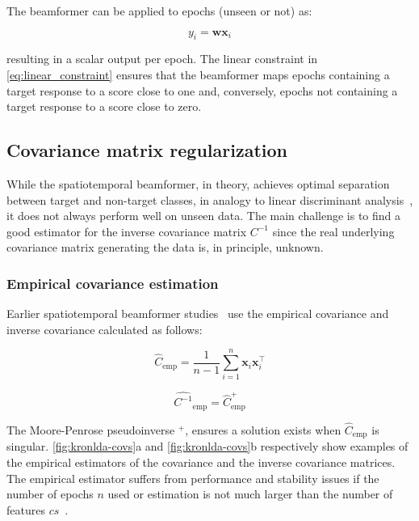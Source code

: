 	The beamformer can be applied to epochs (unseen or not) as:

	\begin{equation}
		y_i = \mathbf{w}\mathbf{x}_i
		\label{eq:apply_beamformer}
	\end{equation}

	resulting in a scalar output per epoch.
	The linear constraint in \autoref{eq:linear_constraint} ensures that the
	beamformer maps epochs containing a target response to a score close to one
	and, conversely, epochs not containing a target response to a score close to
	zero.

	\subsection{Covariance matrix regularization}
	While the spatiotemporal beamformer, in theory, achieves optimal separation
	between target and non-target classes, in analogy to linear discriminant analysis~\cite{TREDER2016279}, it does not always perform well on unseen data.
	The main challenge is to find a good estimator for the inverse covariance matrix $C^{-1}$ since the real underlying covariance matrix generating the data is, in principle, unknown.

	\subsubsection{Empirical covariance estimation}
	\label{sec:empirical_covariance}
	Earlier spatiotemporal beamformer studies~\cite{Wittevrongel2016,
		Wittevrongel2016a, Wittevrongel2017, Wittevrongel2017a} use the empirical
	covariance and inverse covariance calculated as follows:

	\begin{equation}
		\hat{C}_\text{emp} =
		\frac{1}{n-1}\sum^{n}_{i=1}\mathbf{x}_i\mathbf{x}_i^\intercal
		\label{eq:empirical_covariance}
	\end{equation}


	\begin{equation}
		\widehat{C^{-1}}_\text{emp} = \hat{C}_\text{emp}^+
		\label{eq:empirical_inverse_covariance}
	\end{equation}

	The Moore-Penrose pseudoinverse $^+$, ensures a solution exists when $\hat{C}_\text{emp}$ is singular.
	\autoref{fig:kronlda-covs}a and \autoref{fig:kronlda-covs}b respectively show examples of the
	empirical estimators of the covariance and the inverse covariance matrices.
	The empirical estimator suffers from performance and
	stability issues if the number of epochs $n$ used or estimation is not much larger than the number of features $cs$~\cite{Stein1956,Khatri1987}.


